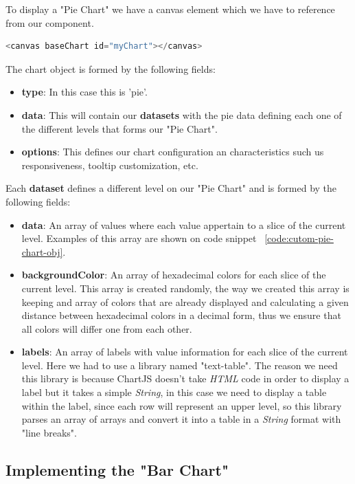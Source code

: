 \documentclass[a4paper, 12pt, english]{book}
\begin{document}
To display a "Pie Chart" we have a canvas element which we have to reference from our component.
\begin{lstlisting}[language=javascript]
<canvas baseChart id="myChart"></canvas>
\end{lstlisting}
The chart object is formed by the following fields:
\begin{itemize}
    \item \textbf{type}: In this case this is 'pie'.
    \item \textbf{data}: This will contain our \textbf{datasets} with the pie data defining each one of the different levels that forms our "Pie Chart".
    \item \textbf{options}: This defines our chart configuration an characteristics such us responsiveness, tooltip customization, etc.
\end{itemize}

Each \textbf{dataset} defines a different level on our "Pie Chart" and is formed by the following fields:
\begin{itemize}
    \item \textbf{data}: An array of values where each value appertain to a slice of the current level. Examples of this array are shown on code snippet ~\ref{code:cutom-pie-chart-obj}.
    \item \textbf{backgroundColor}: An array of hexadecimal colors for each slice of the current level. This array is created randomly, the way we created this array is keeping and array of colors that are already displayed and calculating a given distance between hexadecimal colors in a decimal form, thus we ensure that all colors will differ one from each other.
    \item \textbf{labels}: An array of labels with value information for each slice of the current level. Here we had to use a library named "text-table". The reason we need this library is because ChartJS doesn't take \textit{HTML} code in order to display a label but it takes a simple \textit{String}, in this case we need to display a table within the label, since each row will represent an upper level, so this library parses an array of arrays and convert it into a table in a \textit{String} format with "line breaks".
\end{itemize}

\subsection{Implementing the "Bar Chart"}
\label{sec:pie-chart}
\end{document}
